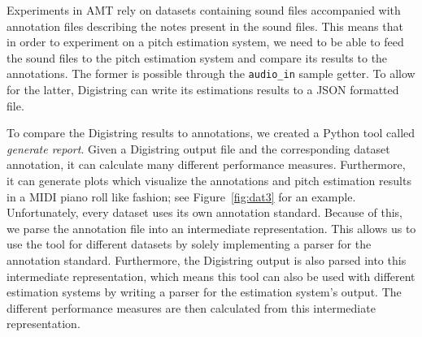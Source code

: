 \documentclass[a4paper,10pt,twocolumn]{article}
\begin{document}
Experiments in AMT rely on datasets containing sound files accompanied with annotation files describing the notes present in the sound files. This means that in order to experiment on a pitch estimation system, we need to be able to feed the sound files to the pitch estimation system and compare its results to the annotations. The former is possible through the \texttt{audio\_in} sample getter. To allow for the latter, Digistring can write its estimations results to a JSON formatted file.

To compare the Digistring results to annotations, we created a Python tool called \textit{generate report}. Given a Digistring output file and the corresponding dataset annotation, it can calculate many different performance measures. Furthermore, it can generate plots which visualize the annotations and pitch estimation results in a MIDI piano roll like fashion; see Figure~\ref{fig:dat3} for an example.
Unfortunately, every dataset uses its own annotation standard. Because of this, we parse the annotation file into an intermediate representation. This allows us to use the tool for different datasets by solely implementing a parser for the annotation standard. Furthermore, the Digistring output is also parsed into this intermediate representation, which means this tool can also be used with different estimation systems by writing a parser for the estimation system's output. The different performance measures are then calculated from this intermediate representation.
\end{document}
